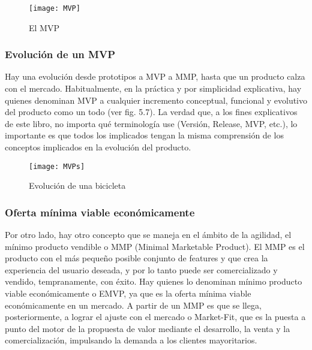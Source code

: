 \begin{figure}[h]
  \centering
  \texttt{[image: MVP]}
  \caption{El MVP}
  \centering
  \label{fig:MVP} %
\end{figure}
\FloatBarrier %


\subsubsection{Evolución de un MVP}

Hay una evolución desde prototipos a MVP a MMP, hasta que un producto calza con el mercado. Habitualmente, en la práctica y por simplicidad explicativa, hay quienes denominan MVP a cualquier incremento conceptual, funcional y evolutivo del producto como un todo (ver fig. 5.7). La verdad que, a los fines explicativos de este libro, no importa qué terminología use (Versión, Release, MVP, etc.), lo importante es que todos los implicados tengan la misma comprensión de los conceptos implicados en la evolución del producto.

\begin{figure}[h]
  \centering
  \texttt{[image: MVPs]}
  \caption{Evolución de una bicicleta}
  \centering
  \label{fig:MVPs} %
\end{figure}
\FloatBarrier %

\subsubsection{Oferta mínima viable económicamente}

Por otro lado, hay otro concepto que se maneja en el ámbito de la agilidad, el mínimo producto vendible o MMP (Minimal Marketable Product). El MMP es el producto con el más pequeño posible conjunto de features y que crea la experiencia del usuario deseada, y por lo tanto puede ser comercializado y vendido, tempranamente, con éxito. Hay quienes lo denominan mínimo producto viable económicamente o EMVP, ya que es la oferta mínima viable económicamente en un mercado. A partir de un MMP es que se llega, posteriormente, a lograr el ajuste con el mercado o Market-Fit, que es la puesta a punto del motor de la propuesta de valor mediante el desarrollo, la venta y la comercialización, impulsando la demanda a los clientes mayoritarios.

